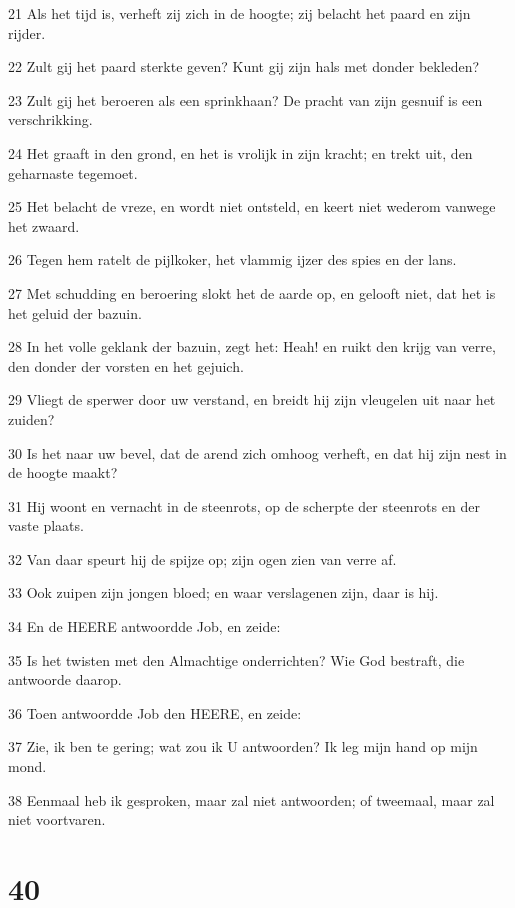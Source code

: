 \par 21 Als het tijd is, verheft zij zich in de hoogte; zij belacht het paard en zijn rijder.
\par 22 Zult gij het paard sterkte geven? Kunt gij zijn hals met donder bekleden?
\par 23 Zult gij het beroeren als een sprinkhaan? De pracht van zijn gesnuif is een verschrikking.
\par 24 Het graaft in den grond, en het is vrolijk in zijn kracht; en trekt uit, den geharnaste tegemoet.
\par 25 Het belacht de vreze, en wordt niet ontsteld, en keert niet wederom vanwege het zwaard.
\par 26 Tegen hem ratelt de pijlkoker, het vlammig ijzer des spies en der lans.
\par 27 Met schudding en beroering slokt het de aarde op, en gelooft niet, dat het is het geluid der bazuin.
\par 28 In het volle geklank der bazuin, zegt het: Heah! en ruikt den krijg van verre, den donder der vorsten en het gejuich.
\par 29 Vliegt de sperwer door uw verstand, en breidt hij zijn vleugelen uit naar het zuiden?
\par 30 Is het naar uw bevel, dat de arend zich omhoog verheft, en dat hij zijn nest in de hoogte maakt?
\par 31 Hij woont en vernacht in de steenrots, op de scherpte der steenrots en der vaste plaats.
\par 32 Van daar speurt hij de spijze op; zijn ogen zien van verre af.
\par 33 Ook zuipen zijn jongen bloed; en waar verslagenen zijn, daar is hij.
\par 34 En de HEERE antwoordde Job, en zeide:
\par 35 Is het twisten met den Almachtige onderrichten? Wie God bestraft, die antwoorde daarop.
\par 36 Toen antwoordde Job den HEERE, en zeide:
\par 37 Zie, ik ben te gering; wat zou ik U antwoorden? Ik leg mijn hand op mijn mond.
\par 38 Eenmaal heb ik gesproken, maar zal niet antwoorden; of tweemaal, maar zal niet voortvaren.

\chapter{40}

